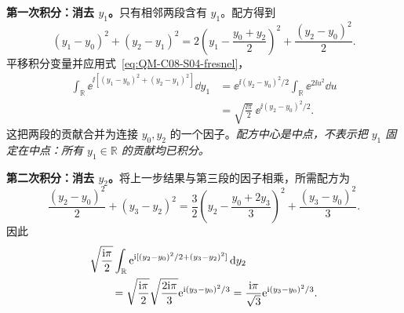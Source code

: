 \textbf{第一次积分：消去 $y_1$。}只有相邻两段含有 $y_1$。配方得到
\begin{equation}
  (y_1-y_0)^2+(y_2-y_1)^2
  =2\left(y_1-\frac{y_0+y_2}{2}\right)^2
    +\frac{(y_2-y_0)^2}{2}.
\end{equation}
平移积分变量并应用式~\eqref{eq:QM-C08-S04-fresnel}，
\begin{align}
  \int_{\mathbb R}\ee^{\ii[(y_1-y_0)^2+(y_2-y_1)^2]}\dd y_1
  &=\ee^{\ii(y_2-y_0)^2/2}\int_{\mathbb R}\ee^{2\ii u^2}\dd u\\
  &=\sqrt{\frac{\ii\pi}{2}}\,
     \ee^{\ii(y_2-y_0)^2/2}.
\end{align}
这把两段的贡献合并为连接 $y_0,y_2$ 的一个因子。\emph{配方中心是中点，不表示把 $y_1$ 固定在中点：所有 $y_1\in\mathbb R$ 的贡献均已积分。}

\textbf{第二次积分：消去 $y_2$。}将上一步结果与第三段的因子相乘，所需配方为
\begin{equation}
  \frac{(y_2-y_0)^2}{2}+(y_3-y_2)^2
  =\frac32\left(y_2-\frac{y_0+2y_3}{3}\right)^2
    +\frac{(y_3-y_0)^2}{3}.
\end{equation}
因此
\begin{align}
  &\sqrt{\frac{\mathrm{i}\pi}{2}}
    \int_{\mathbb R}\mathrm{e}^{\mathrm{i}[(y_2-y_0)^2/2+(y_3-y_2)^2]}\mathop{}\!\mathrm{d} y_2
    \notag\\
  &\qquad=\sqrt{\frac{\mathrm{i}\pi}{2}}\sqrt{\frac{2\mathrm{i}\pi}{3}}
    \mathrm{e}^{\mathrm{i}(y_3-y_0)^2/3}
    =\frac{\mathrm{i}\pi}{\sqrt3}\mathrm{e}^{\mathrm{i}(y_3-y_0)^2/3}.
\end{align}

